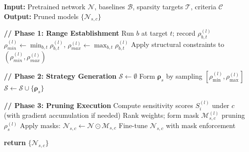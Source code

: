 \documentclass[11pt, conference]{IEEEtran}
\begin{document}
\begin{algorithm}[htbp]
\caption{Mix-and-Match Pruning Framework}
\label{alg:multistrategy}
\begin{algorithmic}[1]
\STATE \textbf{Input:} Pretrained network $\mathcal{N}$, baselines $\mathcal{B}$, sparsity targets $\mathcal{T}$, criteria $\mathcal{C}$
\STATE \textbf{Output:} Pruned models $\{\mathcal{N}_{s,c}\}$

\STATE \textbf{// Phase 1: Range Establishment}
        \STATE Run $b$ at target $t$; record $\rho_{b,t}^{(l)}$
    \ENDFOR
\ENDFOR
{}
    \STATE $\rho_{min}^{(l)} \gets \min_{b,t}\rho_{b,t}^{(l)}$, \;
           $\rho_{max}^{(l)} \gets \max_{b,t}\rho_{b,t}^{(l)}$
    \STATE Apply structural constraints to $(\rho_{min}^{(l)},\rho_{max}^{(l)})$
\ENDFOR

\STATE \textbf{// Phase 2: Strategy Generation}
\STATE $\mathcal{S} \gets \emptyset$
    \STATE Form $\boldsymbol{\rho}_s$ by sampling $[\rho_{\min}^{(l)},\rho_{\max}^{(l)}]$
    \STATE $\mathcal{S} \gets \mathcal{S} \cup \{\boldsymbol{\rho}_s\}$
\ENDFOR

\STATE \textbf{// Phase 3: Pruning Execution}
        \STATE Compute sensitivity scores $S_i^{(l)}$ under $c$ (with gradient accumulation if needed)
            \STATE Rank weights; form mask $\mathcal{M}_{s,c}^{(l)}$ pruning $\rho_s^{(l)}$
        \ENDFOR
        \STATE Apply masks: $\mathcal{N}_{s,c} \gets \mathcal{N} \odot \mathcal{M}_{s,c}$
        \STATE Fine-tune $\mathcal{N}_{s,c}$ with mask enforcement
    \ENDFOR
\ENDFOR

\STATE \textbf{return} $\{\mathcal{N}_{s,c}\}$
\end{algorithmic}
\end{algorithm}



\end{document}
